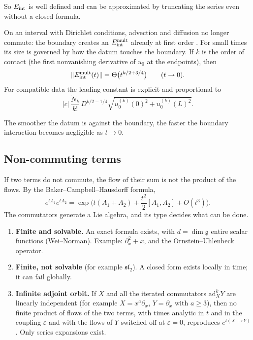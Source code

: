 So $E_{\mathrm{int}}$ is well defined and can be approximated by truncating the series even without a closed formula.

\begin{proposition}\label{prop:boundary}
On an interval with Dirichlet conditions, advection and diffusion no longer commute: the boundary creates an $E_{\mathrm{int}}^{\mathrm{mult}}$ already at first order . For small times its size is governed by how the datum touches the boundary. If $k$ is the order of contact (the first nonvanishing derivative of $u_0$ at the endpoints), then
\[
\|E_{\mathrm{int}}^{\mathrm{mult}}(t)\|=\Theta\big(t^{k/2+3/4}\big)\qquad(t\to0).
\]
For compatible data the leading constant is explicit and proportional to
\[
|c|\,\frac{\tilde N_k}{k!}\,D^{k/2-1/4}\sqrt{u_0^{(k)}(0)^2+u_0^{(k)}(L)^2}.
\]
\end{proposition}

The smoother the datum is against the boundary, the faster the boundary interaction becomes negligible as $t\to0$.

\subsection{Non-commuting terms}\label{f:sec:noncomm}

If two terms do not commute, the flow of their sum is not the product of the flows. By the Baker--Campbell--Hausdorff formula,
\[
e^{tA_1}e^{tA_2}=\exp\Big(t(A_1+A_2)+\frac{t^2}{2}[A_1,A_2]+O(t^3)\Big).
\]
The commutators generate a Lie algebra, and its type decides what can be done.

\begin{theorem}\label{f:thm:lie}
\begin{enumerate}[label=(\alph*)]
\item \textbf{Finite and solvable.} An exact formula exists, with $d=\dim\mathfrak g$ entire scalar functions (Wei--Norman). Example: $\partial_x^2+x$, and the Ornstein--Uhlenbeck operator.
\item \textbf{Finite, not solvable} (for example $\mathfrak{sl}_2$). A closed form exists locally in time; it can fail globally.
\item \textbf{Infinite adjoint orbit.} If $X$ and all the iterated commutators $\mathrm{ad}_X^kY$ are linearly independent (for example $X=x^a\partial_x$, $Y=\partial_x$ with $a\ge3$), then no finite product of flows of the two terms, with times analytic in $t$ and in the coupling $\varepsilon$ and with the flows of $Y$ switched off at $\varepsilon=0$, reproduces $e^{t(X+\varepsilon Y)}$. Only series expansions exist.
\end{enumerate}
\end{theorem}

